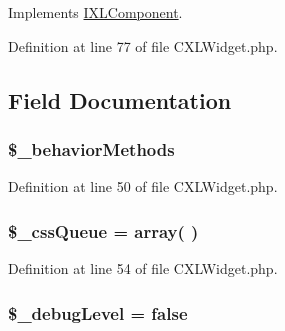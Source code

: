 Implements \hyperlink{interfaceIXLComponent_a91ba7d911e2c3852a048f4022c45ec9e}{IXLComponent}.



Definition at line 77 of file CXLWidget.php.








\subsection{Field Documentation}
\hypertarget{classCXLWidget_ac1d32c0491955b7c0648ab9a304c45c0}{
\subsubsection[{\$\_\-behaviorMethods}]{\setlength{\rightskip}{0pt plus 5cm}\$\_\-behaviorMethods}}
\label{classCXLWidget_ac1d32c0491955b7c0648ab9a304c45c0}


Definition at line 50 of file CXLWidget.php.

\hypertarget{classCXLWidget_a5766011bef2f45b3f312fd6cc1525bf7}{
\subsubsection[{\$\_\-cssQueue}]{\setlength{\rightskip}{0pt plus 5cm}\$\_\-cssQueue = array( )}}
\label{classCXLWidget_a5766011bef2f45b3f312fd6cc1525bf7}


Definition at line 54 of file CXLWidget.php.

\hypertarget{classCXLWidget_a6c76d7fa9253beae006eaaf4e3038ce9}{
\subsubsection[{\$\_\-debugLevel}]{\setlength{\rightskip}{0pt plus 5cm}\$\_\-debugLevel = false}}
\label{classCXLWidget_a6c76d7fa9253beae006eaaf4e3038ce9}


